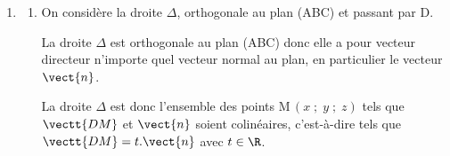 \begin{enumerate}
\begin{enumerate}[label=\textbf{\alph*.}]
$\vect{n} \cdot \vectt{AB} = 5 \times (-1) + 8 \times 1 +(-1) \times 3 = -5+8-3=0$ donc $\vect{n} \perp \vectt{AB}$.

$\vect{n} \cdot \vectt{AC} = 5 \times (-3) + 8 \times 2 +(-1) \times 1 = -15+16-1=0$ donc $\vect{n} \perp \vectt{AC}$.

Le vecteur $\vect{n}$ est donc orthogonal à deux vecteurs directeurs du plan (ABC) donc $\vect{n}$ est un vecteur normal au plan (ABC).

\item 
Le plan (ABC) est l'ensemble des points M\,$(x\;;\;y\;;\;z)$ tels que $\vectt{AM} \perp \vect{n}$.

$\vectt{AM}$ a pour coordonnées 
$\begin{pmatrix}
x-1 \\ y-2 \\ z+1
\end{pmatrix}$

$\begin{aligned}
\vectt{AM} \perp \vect{n}
\iff \vectt{AM} \cdot \vect{n}=0
& \iff (x-1) \times 5 + (y-2) \times 8 + (z+1) \times (-1)=0\\
& \iff 5x-5 +8y-16-z-1=0
\iff 5x+8y-z-22=0
\end{aligned}$

Donc le plan (ABC) a pour équation cartésienne: $5x+8y-z-22=0$.

\item 
On regarde si les coordonnées de D vérifient l'équation du plan.

$5x_{\text D}+8y_{\text D}-z_{\text D}-22
=8\times 5 + 8\times 2 - (-11) -22
= 40 +16 +11 -22 = 45 \neq 0$

Donc le point D n'appartient pas au plan (ABC).

\end{enumerate}

\item
	\begin{enumerate}[label=\textbf{\alph*.}]
		\item On considère la droite $\Delta$, orthogonale au plan (ABC) et passant par D.










La droite $\Delta$ est orthogonale au plan (ABC) donc elle a pour vecteur directeur n'importe quel vecteur normal au plan, en particulier le vecteur $\vect{n}$.

La droite $\Delta$  est donc l'ensemble des points M\,$(x\;;\;y\;;\;z)$ tels que $\vectt{DM}$ et $\vect{n}$ soient colinéaires, c'est-à-dire tels que $\vectt{DM}=t.\vect{n}$ avec $t\in\R$.


\end{enumerate}
\end{enumerate}
